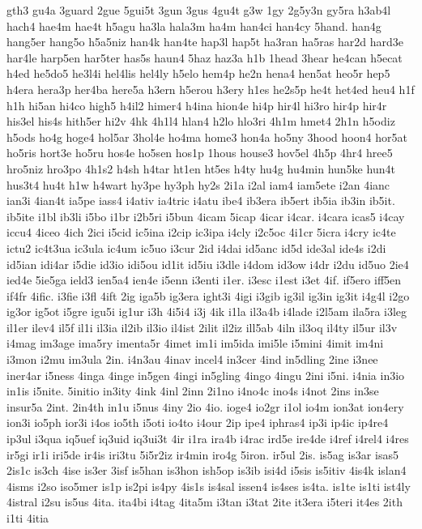 {gth3
gu4a
3guard
2gue
5gui5t
3gun
3gus
4gu4t
g3w
1gy
2g5y3n
gy5ra
h3ab4l
hach4
hae4m
hae4t
h5agu
ha3la
hala3m
ha4m
han4ci
han4cy
5hand.
han4g
hang5er
hang5o
h5a5niz
han4k
han4te
hap3l
hap5t
ha3ran
ha5ras
har2d
hard3e
har4le
harp5en
har5ter
has5s
haun4
5haz
haz3a
h1b
1head
3hear
he4can
h5ecat
h4ed
he5do5
he3l4i
hel4lis
hel4ly
h5elo
hem4p
he2n
hena4
hen5at
heo5r
hep5
h4era
hera3p
her4ba
here5a
h3ern
h5erou
h3ery
h1es
he2s5p
he4t
het4ed
heu4
h1f
h1h
hi5an
hi4co
high5
h4il2
himer4
h4ina
hion4e
hi4p
hir4l
hi3ro
hir4p
hir4r
his3el
his4s
hith5er
hi2v
4hk
4h1l4
hlan4
h2lo
hlo3ri
4h1m
hmet4
2h1n
h5odiz
h5ods
ho4g
hoge4
hol5ar
3hol4e
ho4ma
home3
hon4a
ho5ny
3hood
hoon4
hor5at
ho5ris
hort3e
ho5ru
hos4e
ho5sen
hos1p
1hous
house3
hov5el
4h5p
4hr4
hree5
hro5niz
hro3po
4h1s2
h4sh
h4tar
ht1en
ht5es
h4ty
hu4g
hu4min
hun5ke
hun4t
hus3t4
hu4t
h1w
h4wart
hy3pe
hy3ph
hy2s
2i1a
i2al
iam4
iam5ete
i2an
4ianc
ian3i
4ian4t
ia5pe
iass4
i4ativ
ia4tric
i4atu
ibe4
ib3era
ib5ert
ib5ia
ib3in
ib5it.
ib5ite
i1bl
ib3li
i5bo
i1br
i2b5ri
i5bun
4icam
5icap
4icar
i4car.
i4cara
icas5
i4cay
iccu4
4iceo
4ich
2ici
i5cid
ic5ina
i2cip
ic3ipa
i4cly
i2c5oc
4i1cr
5icra
i4cry
ic4te
ictu2
ic4t3ua
ic3ula
ic4um
ic5uo
i3cur
2id
i4dai
id5anc
id5d
ide3al
ide4s
i2di
id5ian
idi4ar
i5die
id3io
idi5ou
id1it
id5iu
i3dle
i4dom
id3ow
i4dr
i2du
id5uo
2ie4
ied4e
5ie5ga
ield3
ien5a4
ien4e
i5enn
i3enti
i1er.
i3esc
i1est
i3et
4if.
if5ero
iff5en
if4fr
4ific.
i3fie
i3fl
4ift
2ig
iga5b
ig3era
ight3i
4igi
i3gib
ig3il
ig3in
ig3it
i4g4l
i2go
ig3or
ig5ot
i5gre
igu5i
ig1ur
i3h
4i5i4
i3j
4ik
i1la
il3a4b
i4lade
i2l5am
ila5ra
i3leg
il1er
ilev4
il5f
il1i
il3ia
il2ib
il3io
il4ist
2ilit
il2iz
ill5ab
4iln
il3oq
il4ty
il5ur
il3v
i4mag
im3age
ima5ry
imenta5r
4imet
im1i
im5ida
imi5le
i5mini
4imit
im4ni
i3mon
i2mu
im3ula
2in.
i4n3au
4inav
incel4
in3cer
4ind
in5dling
2ine
i3nee
iner4ar
i5ness
4inga
4inge
in5gen
4ingi
in5gling
4ingo
4ingu
2ini
i5ni.
i4nia
in3io
in1is
i5nite.
5initio
in3ity
4ink
4inl
2inn
2i1no
i4no4c
ino4s
i4not
2ins
in3se
insur5a
2int.
2in4th
in1u
i5nus
4iny
2io
4io.
ioge4
io2gr
i1ol
io4m
ion3at
ion4ery
ion3i
io5ph
ior3i
i4os
io5th
i5oti
io4to
i4our
2ip
ipe4
iphras4
ip3i
ip4ic
ip4re4
ip3ul
i3qua
iq5uef
iq3uid
iq3ui3t
4ir
i1ra
ira4b
i4rac
ird5e
ire4de
i4ref
i4rel4
i4res
ir5gi
ir1i
iri5de
ir4is
iri3tu
5i5r2iz
ir4min
iro4g
5iron.
ir5ul
2is.
is5ag
is3ar
isas5
2is1c
is3ch
4ise
is3er
3isf
is5han
is3hon
ish5op
is3ib
isi4d
i5sis
is5itiv
4is4k
islan4
4isms
i2so
iso5mer
is1p
is2pi
is4py
4is1s
is4sal
issen4
is4ses
is4ta.
is1te
is1ti
ist4ly
4istral
i2su
is5us
4ita.
ita4bi
i4tag
4ita5m
i3tan
i3tat
2ite
it3era
i5teri
it4es
2ith
i1ti
4itia
}

